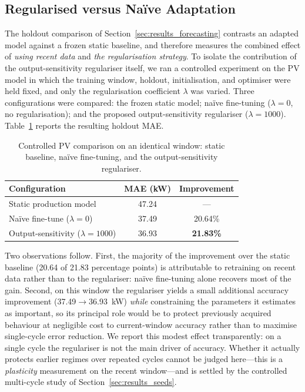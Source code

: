 \documentclass[journal]{IEEEtran}
\begin{document}
\subsection{Regularised versus Na\"ive Adaptation}
\label{sec:results_controlled}

The holdout comparison of Section~\ref{sec:results_forecasting} contrasts
an adapted model against a frozen static baseline, and therefore
measures the combined effect of \emph{using recent data} and \emph{the
regularisation strategy}. To isolate the contribution of the
output-sensitivity regulariser itself, we ran a controlled experiment on
the PV model in which the training window, holdout, initialisation, and
optimiser were held fixed, and only the regularisation coefficient
$\lambda$ was varied. Three configurations were compared: the frozen
static model; na\"ive fine-tuning ($\lambda=0$, no regularisation); and
the proposed output-sensitivity regulariser ($\lambda=1000$).
Table~\ref{tab:controlled} reports the resulting holdout MAE.

\begin{table}[t]
\centering
\caption{Controlled PV comparison on an identical window: static
baseline, na\"ive fine-tuning, and the output-sensitivity regulariser.}
\label{tab:controlled}
\begin{tabular}{@{}lcc@{}}
\toprule
\textbf{Configuration} & \textbf{MAE (kW)} & \textbf{Improvement} \\
\midrule
Static production model & 47.24 & --- \\
Na\"ive fine-tune ($\lambda=0$) & 37.49 & 20.64\% \\
Output-sensitivity ($\lambda=1000$) & 36.93 & \textbf{21.83\%} \\
\bottomrule
\end{tabular}
\end{table}

Two observations follow. First, the majority of the improvement over the
static baseline (20.64 of 21.83 percentage points) is attributable to
retraining on recent data rather than to the regulariser: na\"ive
fine-tuning alone recovers most of the gain. Second, on this window the
regulariser yields a small additional accuracy improvement
(37.49$\rightarrow$36.93~kW) \emph{while} constraining the parameters it
estimates as important, so its principal role would be to protect previously
acquired behaviour at negligible cost to current-window accuracy rather
than to maximise single-cycle error reduction. We report this modest
effect transparently: on a single cycle the regulariser is not the main
driver of accuracy. Whether it actually protects earlier regimes over
repeated cycles cannot be judged here---this is a \emph{plasticity}
measurement on the recent window---and is settled by the controlled
multi-cycle study of Section~\ref{sec:results_seeds}.
\end{document}
